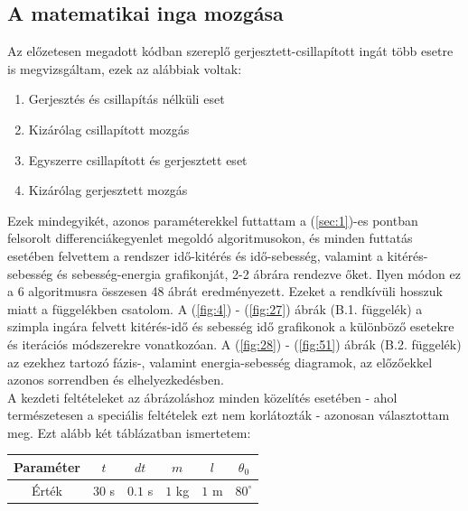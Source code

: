 \begin{multicols}{2}
\subsection{A matematikai inga mozgása} \label{sub:4.1}
Az előzetesen megadott kódban szereplő gerjesztett-csillapított ingát több esetre is megvizsgáltam, ezek az alábbiak voltak:
\begin{enumerate}
    \item Gerjesztés és csillapítás nélküli eset
    \item Kizárólag csillapított mozgás
    \item Egyszerre csillapított és gerjesztett eset
    \item Kizárólag gerjesztett mozgás
\end{enumerate}
Ezek mindegyikét, azonos paraméterekkel futtattam a (\ref{sec:1})-es pontban felsorolt differenciákegyenlet megoldó algoritmusokon, és minden futtatás esetében felvettem a rendszer idő-kitérés és idő-sebesség, valamint a kitérés-sebesség és sebesség-energia grafikonját, 2-2 ábrára rendezve őket. Ilyen módon ez a 6 algoritmusra összesen 48 ábrát eredményezett. Ezeket a rendkívüli hosszuk miatt a  függelékben csatolom. A (\ref{fig:4}) - (\ref{fig:27}) ábrák (B.1. függelék) a szimpla ingára felvett kitérés-idő és sebesség idő grafikonok a különböző esetekre és iterációs módszerekre vonatkozóan. A (\ref{fig:28}) - (\ref{fig:51}) ábrák (B.2. függelék) az ezekhez tartozó fázis-, valamint energia-sebesség diagramok, az előzőekkel azonos sorrendben és elhelyezkedésben.
\\
A kezdeti feltételeket az ábrázoláshoz minden közelítés esetében - ahol természetesen a speciális feltételek ezt nem korlátozták - azonosan választottam meg. Ezt alább két táblázatban ismertetem:

\begin{center}
\begin{tabular}{c||c|c|c|c|c}
    \hline
    Paraméter & $t$     & $dt$     & $m$     & $l$    & $\theta_{0}$  \\ \hline
    Érték     & $30$ s  & $0.1$ s  & $1$ kg  & $1$ m  & $80^{\circ}$  \\ \hline
\end{tabular}
\end{center}
\label{tab1}


\end{multicols}
